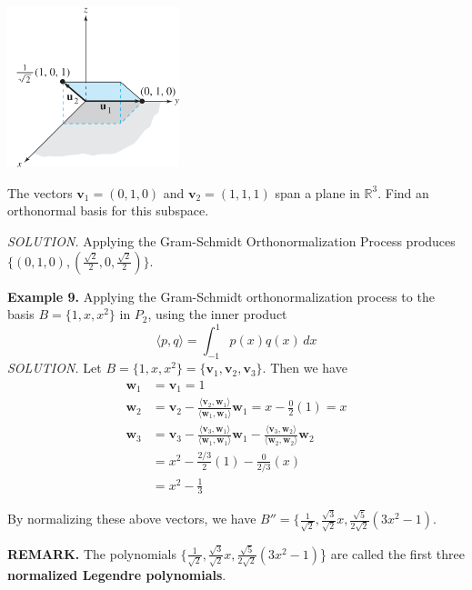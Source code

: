 \documentclass{article}
\newcommand\B{\textbf}
\newcommand\R{\mathbb{R}}
\newcommand\T{\textit}
\newcommand\la{\langle}
\newcommand\ra{\rangle}
\begin{document}
    \begin{minipage}{0.31\linewidth}
        \includegraphics[width = 5cm]{images/gram1.png}
    \end{minipage}
    \begin{minipage}{0.63\linewidth}
        The vectors $\B{v}_1 = (0, 1, 0)$ and $\B{v}_2 = (1, 1, 1)$ span a plane in $\R^3$. Find an orthonormal
        basis for this subspace.

        \T{SOLUTION. } Applying the Gram-Schmidt Orthonormalization Process produces
        $\{ (0, 1, 0), (\frac{\sqrt{2}}{2}, 0, \frac{\sqrt{2}}{2}) \}$.
    \end{minipage}

    \B{Example 9.} Applying the Gram-Schmidt orthonormalization process to the basis $B = \{1, x, x^2\}$ in $P_2$,
    using the inner product 
    \[ \la p, q \ra = \int_{-1}^1 p(x)q(x)\,dx \]
    \T{SOLUTION. } Let $B = \{1, x, x^2 \} = \{ \B{v}_1, \B{v}_2, \B{v}_3 \}$. Then we have
    \begin{equation*}
        \begin{split}
            \B{w}_1 & = \B{v}_1 = 1 \\ 
            \B{w}_2 & = \B{v}_2 - \frac{\la \B{v}_2, \B{w}_1 \ra}{\la \B{w}_1, \B{w}_1\ra}\B{w}_1 = x - \frac{0}{2}(1) = x \\
            \B{w}_3 & = \B{v}_3 - \frac{\la \B{v}_3, \B{w}_1 \ra}{\la \B{w}_1, \B{w}_1\ra}\B{w}_1 -
            \frac{\la \B{v}_3, \B{w}_2 \ra}{\la \B{w}_2, \B{w}_2\ra}\B{w}_2\\
                    & = x^2 - \frac{2/3}{2}(1) - \frac{0}{2/3}(x)\\
                    & = x^2 - \frac{1}{3}
        \end{split} 
    \end{equation*}

    By normalizing these above vectors, we have $B'' = \{ \frac{1}{\sqrt{2}}, \frac{\sqrt{3}}{\sqrt{2}}x, 
        \frac{\sqrt{5}}{2\sqrt{2}}(3x^2 - 1)$.

    \B{REMARK. } The polynomials $\{ \frac{1}{\sqrt{2}}, \frac{\sqrt{3}}{\sqrt{2}}x, 
    \frac{\sqrt{5}}{2\sqrt{2}}(3x^2 - 1)$\} are called the first three \B{normalized
    Legendre polynomials}.
\end{document}
